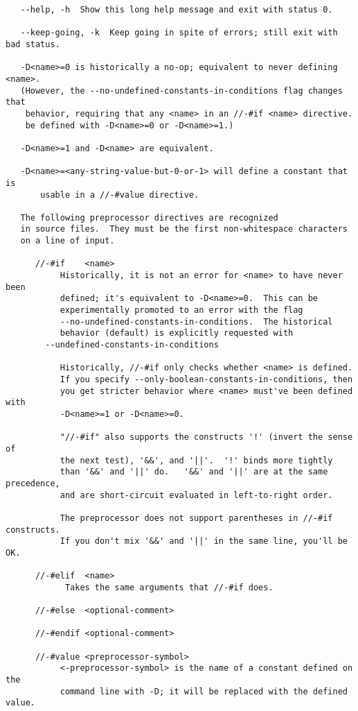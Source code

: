 \begin{verbatim}
   --help, -h  Show this long help message and exit with status 0.

   --keep-going, -k  Keep going in spite of errors; still exit with bad status.

   -D<name>=0 is historically a no-op; equivalent to never defining <name>.
   (However, the --no-undefined-constants-in-conditions flag changes that
    behavior, requiring that any <name> in an //-#if <name> directive.
    be defined with -D<name>=0 or -D<name>=1.)

   -D<name>=1 and -D<name> are equivalent.

   -D<name>=<any-string-value-but-0-or-1> will define a constant that is
       usable in a //-#value directive.

   The following preprocessor directives are recognized
   in source files.  They must be the first non-whitespace characters
   on a line of input.

      //-#if    <name>
           Historically, it is not an error for <name> to have never been
           defined; it's equivalent to -D<name>=0.  This can be 
           experimentally promoted to an error with the flag
           --no-undefined-constants-in-conditions.  The historical
           behavior (default) is explicitly requested with
	    --undefined-constants-in-conditions
           
           Historically, //-#if only checks whether <name> is defined.
           If you specify --only-boolean-constants-in-conditions, then
           you get stricter behavior where <name> must've been defined with
           -D<name>=1 or -D<name>=0.

           "//-#if" also supports the constructs '!' (invert the sense of 
           the next test), '&&', and '||'.  '!' binds more tightly 
           than '&&' and '||' do.   '&&' and '||' are at the same precedence,
           and are short-circuit evaluated in left-to-right order.

           The preprocessor does not support parentheses in //-#if constructs.
           If you don't mix '&&' and '||' in the same line, you'll be OK.

      //-#elif  <name>
            Takes the same arguments that //-#if does. 

      //-#else  <optional-comment>

      //-#endif <optional-comment>

      //-#value <preprocessor-symbol>
           <-preprocessor-symbol> is the name of a constant defined on the
           command line with -D; it will be replaced with the defined value.


\end{verbatim}
